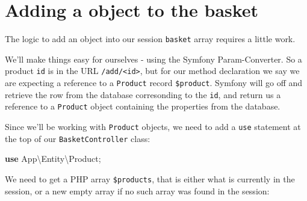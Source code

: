\documentclass[a4paperpaper,openright]{book}
\newenvironment{Shaded}{}{}
\newcommand{\AnnotationTok}[1]{\textcolor[rgb]{0.38,0.63,0.69}{\textbf{\textit{#1}}}}
\newcommand{\CommentTok}[1]{\textcolor[rgb]{0.38,0.63,0.69}{\textit{#1}}}
\newcommand{\KeywordTok}[1]{\textcolor[rgb]{0.00,0.44,0.13}{\textbf{#1}}}
\newcommand{\NormalTok}[1]{#1}
\newcommand{\OtherTok}[1]{\textcolor[rgb]{0.00,0.44,0.13}{#1}}
\newcommand{\StringTok}[1]{\textcolor[rgb]{0.25,0.44,0.63}{#1}}
\begin{document}
\hypertarget{adding-a-object-to-the-basket}{%
\section{Adding a object to the
basket}\label{adding-a-object-to-the-basket}}

The logic to add an object into our session \texttt{basket} array
requires a little work.

We'll make things easy for ourselves - using the Symfony
Param-Converter. So a product \texttt{id} is in the URL
\texttt{/add/\textless{}id\textgreater{}}, but for our method
declaration we say we are expecting a reference to a \texttt{Product}
record \texttt{\$product}. Symfony will go off and retrieve the row from
the database corresonding to the \texttt{id}, and return us a reference
to a \texttt{Product} object containing the properties from the
database.

Since we'll be working with \texttt{Product} objects, we need to add a
\texttt{use} statement at the top of our \texttt{BasketController}
class:

\begin{Shaded}
\begin{Highlighting}[]
    \KeywordTok{use}\NormalTok{ App\textbackslash{}Entity\textbackslash{}Product}\OtherTok{;}
\end{Highlighting}
\end{Shaded}

We need to get a PHP array \texttt{\$products}, that is either what is
currently in the session, or a new empty array if no such array was
found in the session:

\begin{Shaded}
\end{Shaded}
\end{document}
